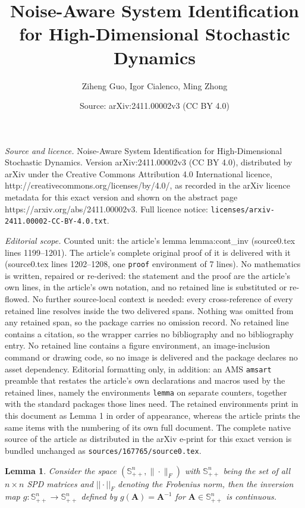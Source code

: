 \documentclass[10pt,a4paper]{amsart}
\title{Noise-Aware System Identification for High-Dimensional Stochastic Dynamics}
\author{Ziheng Guo, Igor Cialenco, Ming Zhong}
\date{Source: arXiv:2411.00002v3 (CC BY 4.0)}
\newtheorem{lemma}{Lemma}
\def\mA{{\bm{A}}}
\newcommand{\norm}[1]{||#1||}
\begin{document}
\maketitle

\noindent\emph{Source and licence.} Noise-Aware System Identification for High-Dimensional Stochastic Dynamics. Version arXiv:2411.00002v3 (CC BY 4.0), distributed by arXiv under the Creative Commons Attribution 4.0 International licence, http://creativecommons.org/licenses/by/4.0/, as recorded in the arXiv licence metadata for this exact version and shown on the abstract page https://arxiv.org/abs/2411.00002v3. Full licence notice: \texttt{licenses/arxiv-2411.00002-CC-BY-4.0.txt}.\par\smallskip

\noindent\textit{Editorial scope.} Counted unit: the article's lemma lemma:cont\_inv (source0.tex lines 1199--1201). The article's complete original proof of it is delivered with it (source0.tex lines 1202--1208, one \texttt{proof} environment of 7 lines). No mathematics is written, repaired or re-derived: the statement and the proof are the article's own lines, in the article's own notation, and no retained line is substituted or re-flowed.  No further source-local context is needed: every cross-reference of every retained line resolves inside the two delivered spans.  Nothing was omitted from any retained span, so the package carries no omission record.  No retained line contains a citation, so the wrapper carries no bibliography and no bibliography entry.  No retained line contains a figure environment, an image-inclusion command or drawing code, so no image is delivered and the package declares no asset dependency.  Editorial formatting only, in addition: an AMS \texttt{amsart} preamble that restates the article's own declarations and macros used by the retained lines, namely the environments \texttt{lemma} on separate counters, together with the standard packages those lines need.  The retained environments print in this document as Lemma 1 in order of appearance, whereas the article prints the same items with the numbering of its own full document.  The complete native source of the article as distributed in the arXiv e-print for this exact version is bundled unchanged as \texttt{sources/167765/source0.tex}.
\begin{lemma} \label{lemma:cont_inv}
Consider the space $(\mathbb{S}_{++}^n, \|\cdot\|_F)$ with $\mathbb{S}_{++}^n$ being the set of all $n \times n$ SPD matrices and $\norm{\cdot}_F$ denoting the Frobenius norm, then the inversion map $g: \mathbb{S}_{++}^n \to \mathbb{S}_{++}^n$ defined by $g(\mA) = \mA^{-1}$ for $\mA \in \mathbb{S}_{++}^n$ is continuous.
\end{lemma}
\end{document}
